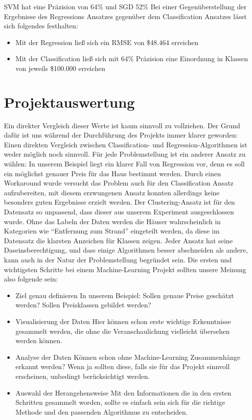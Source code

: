 SVM hat eine Präzision von 64\% und SGD 52\%
\newline
\newline
Bei einer Gegenüberstellung der Ergebnisse des Regressions Ansatzes gegenüber dem Classification Ansatzes lässt sich folgendes festhalten:
\begin{itemize}
\item Mit der Regression ließ sich ein RMSE von \$48.464 erreichen
\item Mit der Classification ließ sich mit 64\% Präzision eine Einordnung in Klassen von jeweils \$100.000 erreichen
\end{itemize}

\section{Projektauswertung}
\label{projektauswertung}
Ein direkter Vergleich dieser Werte ist kaum sinnvoll zu vollziehen.
Der Grund dafür ist uns während der Durchführung des Projekts immer klarer geworden:
Einen direkten Vergleich zwischen Classification- und Regression-Algorithmen ist weder möglich noch sinnvoll. Für jede Problemstellung ist ein anderer Ansatz zu wählen: 
In unserem Beispiel liegt ein klarer Fall von Regression vor, denn es soll ein möglichst genauer Preis für das Haus bestimmt werden. Durch einen Workaround wurde versucht das Problem auch für den Classification Ansatz aufzubereiten, mit diesem erzwungenen Ansatz konnten allerdings keine besonders guten Ergebnisse erzielt werden. Der Clustering-Ansatz ist für den Datensatz so unpassend, dass dieser aus unserem Experiment ausgeschlossen wurde. Ohne das Labeln der Daten werden die Häuser wahrscheinlich in Kategorien wie “Entfernung zum Strand” eingeteilt werden, da diese im Datensatz die klarsten Anzeichen für Klassen zeigen. 
\newline
\newline
Jeder Ansatz hat seine Daseinsberechtigung, und dass einige Algorithmen besser abschneiden als andere, kann auch in der Natur der Problemstellung begründet sein. 
Die ersten und wichtigsten Schritte bei einem Machine-Learning Projekt sollten unsere Meinung also folgende sein:
\begin{itemize}
\item Ziel genau definieren \newline
In unserem Beispiel: Sollen genaue Preise geschätzt werden? Sollen Preisklassen gebildet werden?
\item Visualisierung der Daten \newline
Hier können schon erste wichtige Erkenntnisse gesammelt werden, die ohne die Veranschaulichung vielleicht übersehen werden können.
\item Analyse der Daten \newline
Können schon ohne Machine-Learning Zusammenhänge erkannt werden? 
Wenn ja sollten diese, falls sie für das Projekt sinnvoll erscheinen, unbedingt berücksichtigt werden.
\item Auswahl der Herangehensweise \newline
Mit den Informationen die in den ersten Schritten gesammelt worden, sollte es einfach sein sich für die richtige Methode und den passenden Algorithmus zu entscheiden.
\end{itemize}
